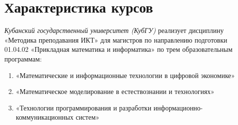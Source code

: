 \documentclass{math-mech-sci}
\begin{document}
% 
%  




\section{Характеристика курсов}

{\it Кубанский государственный университет (КубГУ)} реализует дисциплину «Методика преподавания ИКТ» для магистров по направлению подготовки 01.04.02 «Прикладная математика и информатика» по трем образовательным программам:
\begin{enumerate}
\item «Математические и информационные технологии в цифровой экономике»
\item «Математическое моделирование в естествознании и технологиях»
\item «Технологии программирования и разработки информационно-коммуникационных систем»
\end{enumerate}
\end{document}
